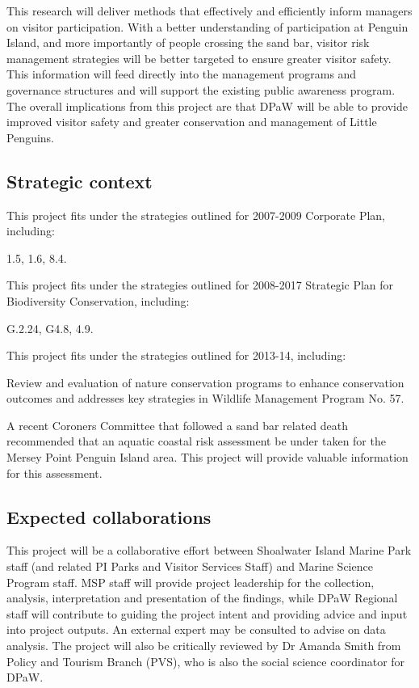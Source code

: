 \documentclass[version=last,
    paper=a4,                               %
    10pt,                                   %
    dvipsnames,
    oneside,                              %
    headings=openany,                       %
    open=any,
    BCOR=7mm,                               %
    DIV=15,     %
]{scrbook}
\begin{document}
This research will deliver methods that effectively and efficiently
inform managers on visitor participation. With a better understanding of
participation at Penguin Island, and more importantly of people crossing
the sand bar, visitor risk management strategies will be better targeted
to ensure greater visitor safety. This information will feed directly
into the management programs and governance structures and will support
the existing public awareness program. The overall implications from
this project are that DPaW will be able to provide improved visitor
safety and greater conservation and management of Little Penguins.




\subsection*{Strategic context}

This project fits under the strategies outlined for 2007-2009 Corporate
Plan, including:

1.5, 1.6, 8.4.

This project fits under the strategies outlined for 2008-2017 Strategic
Plan for Biodiversity Conservation, including:

G.2.24, G4.8, 4.9.

This project fits under the strategies outlined for 2013-14, including:

Review and evaluation of nature conservation programs to enhance
conservation outcomes and addresses key strategies in Wildlife
Management Program No. 57.

A recent Coroners Committee that followed a sand bar related death
recommended that an aquatic coastal risk assessment be under taken for
the Mersey Point Penguin Island area. This project will provide valuable
information for this assessment.




\subsection*{Expected collaborations}

This project will be a collaborative effort between Shoalwater Island
Marine Park staff (and related PI Parks and Visitor Services Staff) and
Marine Science Program staff. MSP staff will provide project leadership
for the collection, analysis, interpretation and presentation of the
findings, while DPaW Regional staff will contribute to guiding the
project intent and providing advice and input into project outputs. An
external expert may be consulted to advise on data analysis. The project
will also be critically reviewed by Dr Amanda Smith from Policy and
Tourism Branch (PVS), who is also the social science coordinator for
DPaW.
\end{document}
